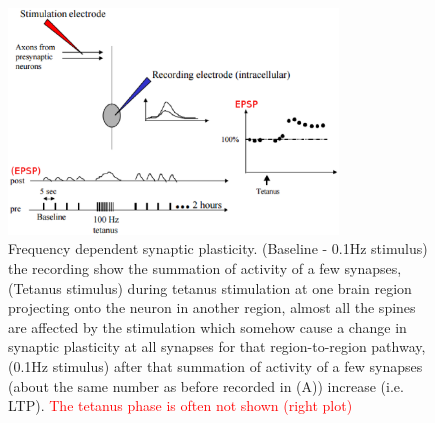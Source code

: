 \begin{figure}[htbp]
  \centerline{\includegraphics[height=6cm]{./images/frequency-dependent_plasticity.eps}}
  \caption{Frequency dependent synaptic plasticity.
  (Baseline - 0.1Hz stimulus) the recording show the summation of activity of a
  few synapses, (Tetanus stimulus) during tetanus stimulation at one brain
  region projecting onto the neuron in another region, almost all the spines are
  affected by the stimulation which somehow cause a change in synaptic
  plasticity at all synapses for that region-to-region pathway, (0.1Hz stimulus)
  after that summation of activity of a few synapses (about the same number as
  before recorded in (A)) increase (i.e.
  LTP).
  \textcolor{red}{The tetanus phase is often not shown (right plot)}}
  \label{fig:frequency-dependent_plasticity}
\end{figure}

 



